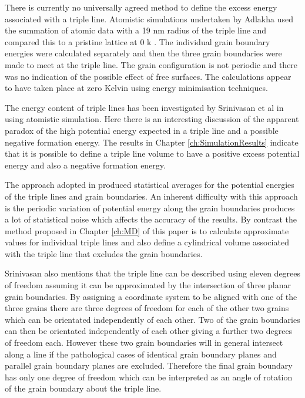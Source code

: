 \documentclass[12pt,a4paper,openany]{report}
\begin{document}
There is currently no universally agreed method to define the excess energy associated with a triple line. Atomistic simulations undertaken by Adlakha used the summation of atomic data with a 19 nm radius of the triple line and compared this to a pristine lattice at 0 k \cite{Adlakha2015}. The individual grain boundary energies were calculated separately and then the three grain boundaries were made to meet at the triple line. The grain configuration is not periodic and there was no indication of the possible effect of free surfaces. The calculations appear to have taken place at zero Kelvin using energy minimisation techniques. 

The energy content of triple lines has been investigated by Srinivasan et al in \cite{Srinivasan1999} using atomistic simulation. Here there is an interesting discussion of the apparent paradox of the high potential energy expected in a triple line and a possible negative formation energy. The results in Chapter \ref{ch:SimulationResults} indicate that it is possible to define a triple line volume to have a positive excess potential energy and also a negative formation energy. 

The approach adopted in \cite{Srinivasan1999}   
produced statistical averages for the potential energies of the triple lines and grain boundaries. An inherent difficulty with this approach is the periodic variation of potential energy along the grain boundaries produces a lot of statistical noise which affects the accuracy of the results. By contrast the method proposed in Chapter \ref{ch:MD} of this paper is to calculate approximate values for individual triple lines and also define a cylindrical volume associated with the triple line that excludes the grain boundaries.

Srinivasan also mentions that the triple line can be described using eleven degrees of freedom assuming it can be approximated by the intersection of three planar grain boundaries. By assigning a coordinate system to be aligned with one of the three grains there are three degrees of freedom for each of the other two grains which can be orientated independently of each other. Two of the grain boundaries can then be orientated independently of each other giving a further two degrees of freedom each. However these two grain boundaries will in general intersect along a line if the pathological cases of identical grain boundary planes and parallel grain boundary planes are excluded. Therefore the final grain boundary has only one degree of freedom which can be interpreted as an angle of rotation of the grain boundary about the triple line.
\end{document}
